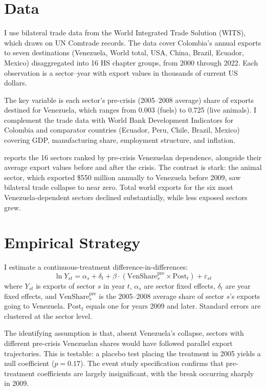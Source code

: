 \documentclass[12pt]{article}
\begin{document}
\section{Data}

I use bilateral trade data from the World Integrated Trade Solution (WITS), which draws on UN Comtrade records. The data cover Colombia's annual exports to seven destinations (Venezuela, World total, USA, China, Brazil, Ecuador, Mexico) disaggregated into 16 HS chapter groups, from 2000 through 2022. Each observation is a sector--year with export values in thousands of current US dollars.

The key variable is each sector's pre-crisis (2005--2008 average) share of exports destined for Venezuela, which ranges from 0.003 (fuels) to 0.725 (live animals). I complement the trade data with World Bank Development Indicators for Colombia and comparator countries (Ecuador, Peru, Chile, Brazil, Mexico) covering GDP, manufacturing share, employment structure, and inflation.



 reports the 16 sectors ranked by pre-crisis Venezuelan dependence, alongside their average export values before and after the crisis. The contrast is stark: the animal sector, which exported \$550 million annually to Venezuela before 2009, saw bilateral trade collapse to near zero. Total world exports for the six most Venezuela-dependent sectors declined substantially, while less exposed sectors grew.

\section{Empirical Strategy}

I estimate a continuous-treatment difference-in-differences:
\begin{equation}
\ln Y_{st} = \alpha_s + \delta_t + \beta \cdot (\text{VenShare}^{\text{pre}}_s \times \text{Post}_t) + \varepsilon_{st}
\label{eq:main}
\end{equation}
where $Y_{st}$ is exports of sector $s$ in year $t$, $\alpha_s$ are sector fixed effects, $\delta_t$ are year fixed effects, and $\text{VenShare}^{\text{pre}}_s$ is the 2005--2008 average share of sector $s$'s exports going to Venezuela. $\text{Post}_t$ equals one for years 2009 and later. Standard errors are clustered at the sector level.

The identifying assumption is that, absent Venezuela's collapse, sectors with different pre-crisis Venezuelan shares would have followed parallel export trajectories. This is testable: a placebo test placing the treatment in 2005 yields a null coefficient ($p = 0.17$). The event study specification confirms that pre-treatment coefficients are largely insignificant, with the break occurring sharply in 2009.
\end{document}
